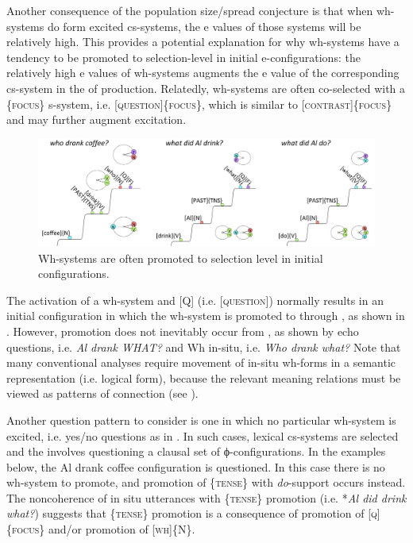   Another consequence of the population size/spread conjecture is that when wh-systems do form excited cs-systems, the e values of those systems will be relatively high. This provides a potential explanation for why wh-systems have a tendency to be promoted to selection-level in initial e-con\-fig\-u\-ra\-tions: the relatively high e values of wh-systems augments the e value of the corresponding cs-system in the  of production. Relatedly, wh-systems are often co-selected with a \{\textsc{focus}\} s-system, i.e. [\textsc{question}]\{\textsc{focus}\}, which is similar to [\textsc{contrast}]\{\textsc{focus}\} and may further augment excitation.

  
\begin{figure}
\includegraphics[width=\textwidth]{figures/Tilsen-img159.png}
\caption{Wh-systems are often promoted to selection level in initial configurations.}
\label{fig:7:15}
\end{figure}
 

  The activation of a wh-system and [Q] (i.e. [\textsc{question}]) normally results in an initial configuration in which the wh-system is promoted to  through , as shown in {}. However, promotion does not inevitably occur from , as shown by echo questions, i.e. \textit{Al drank WHAT?} and Wh in-situ, i.e. \textit{Who drank what?} Note that many conventional analyses require movement of in-situ wh-forms in a semantic representation (i.e. logical form), because the relevant meaning relations must be viewed as patterns of connection (see \citealt{Reinhart1998,Watanabe1992}).

  Another question pattern to consider is one in which no particular wh-system is excited, i.e. yes/no questions as in {}. In such cases, lexical cs-systems are selected and the  involves questioning a clausal set of ϕ-con\-fig\-u\-ra\-tions. In the examples below, the {\textbar}Al drank coffee{\textbar} configuration is questioned. In this case there is no wh-system to promote, and promotion of \{\textsc{tense}\} with \textit{do}{}-support occurs instead. The noncoherence of in situ utterances with \{\textsc{tense}\} promotion (i.e. *\textit{Al did drink what?}) suggests that \{\textsc{tense}\} promotion is a consequence of promotion of [\textsc{q}]\{\textsc{focus}\} and/or promotion of [\textsc{wh}]\{N\}. 


